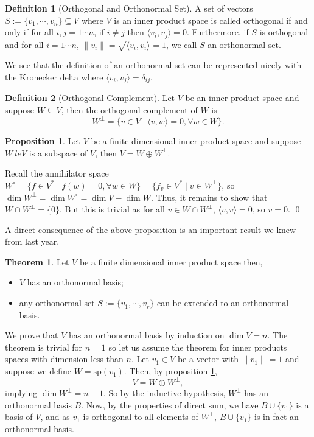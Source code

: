 \documentclass[
]{article}
\theoremstyle{definition}
\newtheorem{theorem}{Theorem}
\newtheorem{prop}{Proposition}[section]
\theoremstyle{definition}
\newtheorem{definition}{Definition}[section]
\begin{document}
\begin{definition}[Orthogonal and Orthonormal Set]
  A set of vectors \(S := \{v_1, \cdots, v_n\} \subseteq V\) where \(V\) is 
  an inner product space is called orthogonal if and only if for all 
  \(i, j = 1 \cdots n\), if \(i \neq j\) then \(\langle v_i, v_j \rangle = 0\). 
  Furthermore, if \(S\) is orthogonal and for all \(i = 1 \cdots n\), 
  \(\| v_i \| = \sqrt{\langle v_i, v_i \rangle} = 1\), we call \(S\) an 
  orthonormal set.
\end{definition}

We see that the definition of an orthonormal set can be represented
nicely with the Kronecker delta where
\(\langle v_i, v_j \rangle = \delta_{ij}\).

\begin{definition}[Orthogonal Complement]
  Let \(V\) be an inner product space and suppose \(W \subseteq V\), then the 
  orthogonal complement of \(W\) is 
  \[W^{\bot} = \{v \in V \mid \langle v, w \rangle = 0, \forall w \in W\}.\]
\end{definition}

\begin{prop}\label{dsumorth}
  Let \(V\) be a finite dimensional inner product space and suppose \(W\ le V\) 
  is a subspace of \(V\), then \(V = W \oplus W^\bot\).
\end{prop}
\proof

Recall the annihilator space
\(W^\circ = \{f \in V^* \mid f(w) = 0, \forall w \in W\}  = \{f_v \in V^* \mid v \in W^\bot\}\),
so \(\dim W^\bot = \dim W^\circ =  \dim V - \dim W\). Thus, it remains
to show that \(W \cap W^\bot = \{0\}\). But this is trivial as for all
\(v \in W \cap W^\bot\), \(\langle v, v \rangle = 0\), so \(v = 0\).
\qed

A direct consequence of the above proposition is an important result we
knew from last year.

\begin{theorem}
  Let \(V\) be a finite dimensional inner product space then,
  \begin{itemize}
    \item \(V\) has an orthonormal basis;
    \item any orthonormal set \(S := \{v_1, \cdots, v_r\}\) can be extended to an 
      orthonormal basis.
  \end{itemize}
\end{theorem}
\proof

We prove that \(V\) has an orthonormal basis by induction on
\(\dim V = n\). The theorem is trivial for \(n = 1\) so let us assume
the theorem for inner products spaces with dimension less than \(n\).
Let \(v_1 \in V\) be a vector with \(\| v_1 \| = 1\) and suppose we
define \(W = \text{sp}(v_1)\). Then, by proposition \ref{dsumorth},
\[V = W \oplus W^\bot,\] implying \(\dim W^\bot = n - 1\). So by the
inductive hypothesis, \(W^\bot\) has an orthonormal basis \(B\). Now, by
the properties of direct sum, we have \(B \cup \{v_1\}\) is a basis of
\(V\), and as \(v_1\) is orthogonal to all elements of \(W^\bot\),
\(B \cup \{v_1\}\) is in fact an orthonormal basis.
\end{document}
